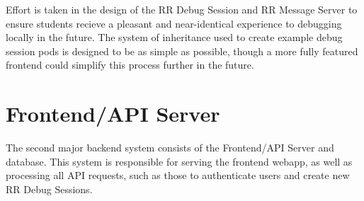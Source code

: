 \documentclass[12pt]{article}
\begin{document}
Effort is taken in the design of the RR Debug Session and RR Message
Server to ensure students recieve a pleasant and near-identical
experience to debugging locally in the future.  The system of
inheritance used to create example debug session pods is designed to
be as simple as possible, though a more fully featured frontend could
simplify this process further in the future.






\section{Frontend/API Server}\label{api}

The second major backend system consists of the Frontend/API Server
and database.  This system is responsible for serving the frontend
webapp, as well as processing all API requests, such as those to
authenticate users and create new RR Debug Sessions.
\end{document}
